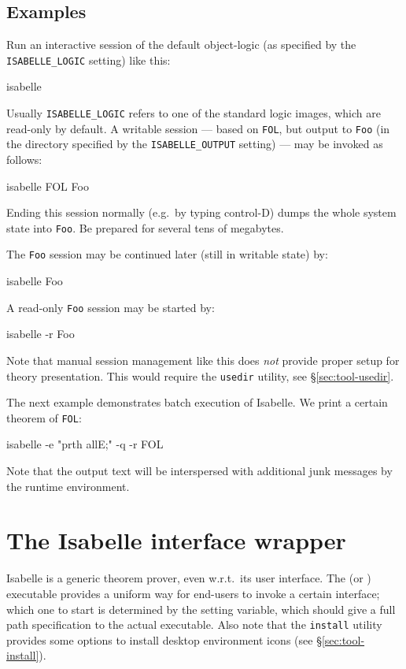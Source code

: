 \subsection*{Examples}

Run an interactive session of the default object-logic (as specified
by the \texttt{ISABELLE_LOGIC} setting) like this:
\begin{ttbox}
isabelle
\end{ttbox}
Usually \texttt{ISABELLE_LOGIC} refers to one of the standard logic
images, which are read-only by default.  A writable session --- based
on \texttt{FOL}, but output to \texttt{Foo} (in the directory
specified by the \texttt{ISABELLE_OUTPUT} setting) --- may be invoked
as follows:
\begin{ttbox}
isabelle FOL Foo
\end{ttbox}
Ending this session normally (e.g.\ by typing control-D) dumps the whole {\ML}
system state into \texttt{Foo}. Be prepared for several tens of megabytes.

The \texttt{Foo} session may be continued later (still in writable
state) by:
\begin{ttbox}
isabelle Foo
\end{ttbox}
A read-only \texttt{Foo} session may be started by:
\begin{ttbox}
isabelle -r Foo
\end{ttbox}

\medskip Note that manual session management like this does \emph{not} provide
proper setup for theory presentation.  This would require the \texttt{usedir}
utility, see \S\ref{sec:tool-usedir}.

\bigskip The next example demonstrates batch execution of Isabelle. We print a
certain theorem of \texttt{FOL}:
\begin{ttbox}
isabelle -e "prth allE;" -q -r FOL
\end{ttbox}
Note that the output text will be interspersed with additional junk messages
by the {\ML} runtime environment.


\section{The Isabelle interface wrapper}\label{sec:interface}

Isabelle is a generic theorem prover, even w.r.t.\ its user interface.  The
 (or ) executable provides a
uniform way for end-users to invoke a certain interface; which one to start is
determined by the  setting variable, which should
give a full path specification to the actual executable.  Also note that the
\texttt{install} utility provides some options to install desktop environment
icons (see \S\ref{sec:tool-install}).

